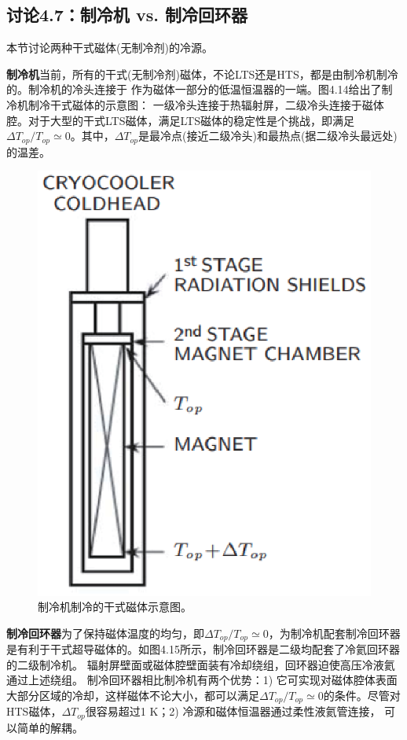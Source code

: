 \subsection{讨论4.7：制冷机 vs. 制冷回环器}
本节讨论两种干式磁体(无制冷剂)的冷源。

\textbf{制冷机}\qquad 当前，所有的干式(无制冷剂)磁体，不论LTS还是HTS，都是由制冷机制冷的。制冷机的冷头连接于
作为磁体一部分的低温恒温器的一端。图4.14给出了制冷机制冷干式磁体的示意图：
一级冷头连接于热辐射屏，二级冷头连接于磁体腔。对于大型的干式LTS磁体，满足LTS磁体的稳定性是个挑战，即满足
$\Delta T_{op}/T_{op}\simeq 0$。其中，$\Delta T_{op}$是最冷点(接近二级冷头)和最热点(据二级冷头最远处)的温差。
\begin{figure}[htbp]
	\centering
	\includegraphics[scale=0.6]{chpt4/figs/fig4.14.eps}
	\caption{制冷机制冷的干式磁体示意图。}
\end{figure}

\textbf{制冷回环器}\qquad 为了保持磁体温度的均匀，即$\Delta T_{op}/T_{op}\simeq 0$，为制冷机配套制冷回环器
是有利于干式超导磁体的。如图4.15所示，制冷回环器是二级均配套了冷氦回环器的二级制冷机。
辐射屏壁面或磁体腔壁面装有冷却绕组，回环器迫使高压冷液氦通过上述绕组。
制冷回环器相比制冷机有两个优势：1) 它可实现对磁体腔体表面大部分区域的冷却，这样磁体不论大小，都可以满足$\Delta T_{op}/T_{op}\simeq 0$的条件。尽管对HTS磁体，$\Delta T_{op}$很容易超过1 K；2) 冷源和磁体恒温器通过柔性液氦管连接，
可以简单的解耦。


